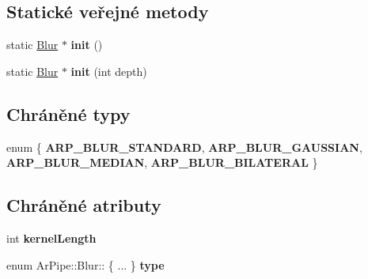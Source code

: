 \subsection*{Statické veřejné metody}
\begin{DoxyCompactItemize}
\item 
\hypertarget{class_ar_pipe_1_1_blur_ad4aa0c1151bd29d6e9cccfa82d8eb063}{static \hyperlink{class_ar_pipe_1_1_blur}{Blur} $\ast$ {\bfseries init} ()}\label{d1/df9/class_ar_pipe_1_1_blur_ad4aa0c1151bd29d6e9cccfa82d8eb063}

\item 
\hypertarget{class_ar_pipe_1_1_blur_a47e5a6d2c7d247538f069cfef75434f4}{static \hyperlink{class_ar_pipe_1_1_blur}{Blur} $\ast$ {\bfseries init} (int depth)}\label{d1/df9/class_ar_pipe_1_1_blur_a47e5a6d2c7d247538f069cfef75434f4}

\end{DoxyCompactItemize}
\subsection*{Chráněné typy}
\begin{DoxyCompactItemize}
\item 
enum \{ {\bfseries A\-R\-P\-\_\-\-B\-L\-U\-R\-\_\-\-S\-T\-A\-N\-D\-A\-R\-D}, 
{\bfseries A\-R\-P\-\_\-\-B\-L\-U\-R\-\_\-\-G\-A\-U\-S\-S\-I\-A\-N}, 
{\bfseries A\-R\-P\-\_\-\-B\-L\-U\-R\-\_\-\-M\-E\-D\-I\-A\-N}, 
{\bfseries A\-R\-P\-\_\-\-B\-L\-U\-R\-\_\-\-B\-I\-L\-A\-T\-E\-R\-A\-L}
 \}
\end{DoxyCompactItemize}
\subsection*{Chráněné atributy}
\begin{DoxyCompactItemize}
\item 
\hypertarget{class_ar_pipe_1_1_blur_a5dd8d1e00f61f3544a67a936361eb970}{int {\bfseries kernel\-Length}}\label{d1/df9/class_ar_pipe_1_1_blur_a5dd8d1e00f61f3544a67a936361eb970}

\item 
\hypertarget{class_ar_pipe_1_1_blur_a341dc684c8555c62e28a408c5920bb63}{enum Ar\-Pipe\-::\-Blur\-:: \{ ... \}  {\bfseries type}}\label{d1/df9/class_ar_pipe_1_1_blur_a341dc684c8555c62e28a408c5920bb63}

\end{DoxyCompactItemize}


